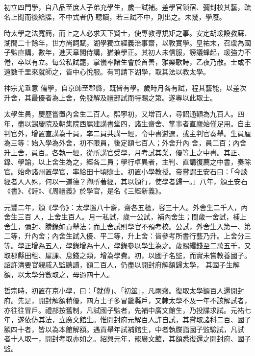 \begin{pinyinscope}
 初立四門學，自八品至庶人子弟充學生，歲一試補。差學官鎖宿、彌封校其藝，疏名上聞而後給牒，不中式者仍
 聽讀，若三試不中，則出之。未幾，學廢。



 時太學之法寬簡，而上之人必求天下賢士，使專教導規矩之事。安定胡瑗設教蘇、湖間二十餘年，世方尚詞賦，湖學獨立經義治事齋，以敦實學。皇祐末，召瑗為國子監直講，數年，進天章閣侍講，猶兼學正。其初人未信服，謗議蜂起，瑗強力不倦，卒以有立。每公私試罷，掌儀率諸生會於首善，雅樂歌詩，乙夜乃散。士或不遠數千里來就師之，皆中心悅服。有司請下湖學，取其法以教太學。



 神宗尤垂意
 儒學，自京師至郡縣，既皆有學。歲時月各有試，程其藝能，以差次升舍，其最優者為上舍，免發解及禮部試而特賜之第。遂專以此取士。



 太學生員，慶歷嘗置內舍生二百人。熙寧初，又增百人，尋詔通額為九百人。四年，盡以錫慶院及朝集院西廡建講書堂四，諸生齋舍、掌事者直廬始僅足用。自主判官外，增置直講為十員，率二員共講一經，令中書遴選，或主判官奏舉。生員厘為三等：始入學為外舍，初不限員，後定額七百人；外舍升內
 舍，員二百；內舍升上舍，員百。各執一經，從所講官受學，月考試其業，優等上之中書。其正、錄、學諭，以上舍生為之，經各二員；學行卓異者，主判、直講復薦之中書，奏除官。始命諸州置學官，率給田十頃贍士。初置小學教授。帝嘗謂王安石曰：「今談經者人人殊，何以一道德？卿所著經，其以頒行，使學者歸一。」八年，頒王安石《書》、《詩》、《周禮義》於學官，是名《三經新義》。



 元豐二年，頒《學令》：太學置八十齋，齋各五楹，容三十人。外舍生二千人，內舍生三百
 人，上舍生百人。月一私試，歲一公試，補內舍生；間歲一舍試，補上舍生，彌封、謄錄如貢舉法；而上舍試則學官不預考校。公試，外舍生入第一、第二等，升內舍；內舍生試入優、平二等，升上舍：皆參考所書行藝乃升。上舍分三等。學正增為五人，學錄增為十人，學錄參以學生為之。歲賜緡錢至二萬五千，又取郡縣田租、屋課、息錢之類，增為學費。初，以國子名監，而實未嘗教養國子。詔許清要官親戚入監聽讀，額二百人，仍盡以開封府解額歸太學，
 其國子生解額，以太學分數取之，毋過四十人。



 哲宗時，初置在京小學，曰：「就傅」、「初筮」，凡兩齋。復取太學額百人還開封府。先是，開封解額稍優，四方士子多冒畿縣戶，又隸太學不及一年不該解試者，亦往往冒戶。禮部按舊制，凡試國子監者，先補中廣文館生，乃投牒求試。元祐七年，遂依仿其法，立廣文館生。惟開封府元解百人許自試，其嘗取諸科二百、國子額四十者，皆以為本館解額。遇貢舉年試補館生，中者執牒詣國子監驗試，凡試
 者十人取一，開封考取亦如之。紹興元年，罷廣文館，其額悉復還之開封府、國子監。




\end{pinyinscope}
